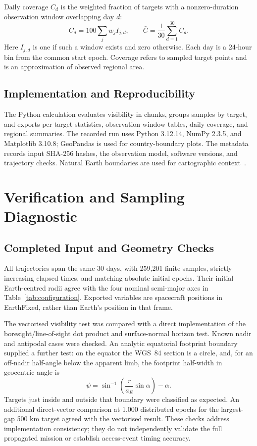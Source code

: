 \documentclass[conf]{new-aiaa}
\begin{document}
Daily coverage $C_d$ is the weighted fraction of targets with a nonzero-duration
observation window overlapping day $d$:
\begin{equation}
C_d=100\sum_jw_j I_{j,d},\qquad
\bar C=\frac{1}{30}\sum_{d=1}^{30}C_d.
\end{equation}
Here $I_{j,d}$ is one if such a window exists and zero otherwise. Each day
is a 24-hour bin from the common start epoch. Coverage refers to sampled
target points and is an approximation of observed regional area.

\subsection{Implementation and Reproducibility}
The Python calculation evaluates visibility in chunks, groups samples by
target, and exports per-target statistics, observation-window tables, daily
coverage, and regional summaries. The recorded run uses Python 3.12.14,
NumPy 2.3.5, and Matplotlib 3.10.8; GeoPandas is used for country-boundary
plots. The metadata records input SHA-256 hashes, the observation model,
software versions, and trajectory checks. Natural Earth boundaries are
used for cartographic context~\cite{naturalearth}.

\section{Verification and Sampling Diagnostic}
\label{sec:verification}
\subsection{Completed Input and Geometry Checks}
All trajectories span the same 30 days, with 259,201 finite samples,
strictly increasing elapsed times, and matching absolute initial epochs.
Their initial Earth-centred radii agree with the four nominal semi-major
axes in Table~\ref{tab:configuration}. Exported variables are spacecraft
positions in EarthFixed, rather than Earth's position in that frame.

The vectorised visibility test was compared with a direct implementation
of the boresight/line-of-sight dot product and surface-normal horizon test.
Known nadir and antipodal cases were checked. An analytic equatorial
footprint boundary supplied a further test: on the equator the WGS~84
section is a circle, and, for an off-nadir half-angle below the apparent
limb, the footprint half-width in geocentric angle is
\begin{equation}
\psi=\sin^{-1}\!\left(\frac{r}{a_E}\sin\alpha\right)-\alpha.
\end{equation}
Targets just inside and outside that boundary were classified as expected.
An additional direct-vector comparison at 1,000 distributed epochs for the
largest-gap 500 km target agreed with the vectorised result. These checks
address implementation consistency; they do not independently validate the
full propagated mission or establish access-event timing accuracy.
\end{document}
